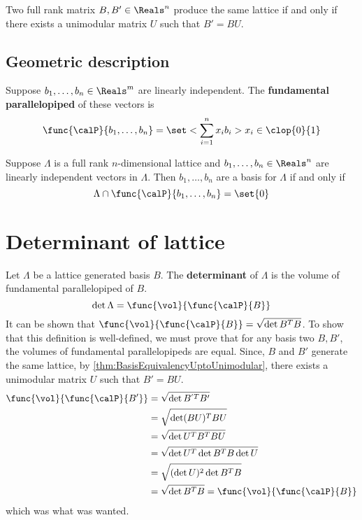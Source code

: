 \begin{theorem}\label{thm:BasisEquivalencyUptoUnimodular}
    Two full rank matrix \(B,B' \in \Reals^n\) produce the same lattice if and only if there exists a unimodular matrix \(U\) such that \(B' = BU\).
\end{theorem}

\subsection{Geometric description}
\begin{definition}
    Suppose \(b_1, \dots, b_n \in \Reals^m\) are linearly independent. The \textbf{fundamental parallelopiped} of these vectors is 
    \begin{equation*}
        \func{\calP}{b_1,\dots, b_n} = \set<\sum_{i=1}^n x_i b_i>{x_i \in \clop{0}{1}}
    \end{equation*}
\end{definition}

\begin{theorem}
    Suppose \(\Lambda\) is a full rank \(n\)-dimensional lattice and \(b_1, \dots, b_n \in \Reals^n\) are linearly independent vectors in \(\Lambda\). Then \(b_1, \dots, b_n\) are a basis for \(\Lambda\) if and only if 
    \begin{equation*}
        \Lambda \cap \func{\calP}{b_1,\dots, b_n} = \set{0}
    \end{equation*}
\end{theorem}

\section{Determinant of lattice}
\begin{definition}
    Let \(\Lambda\) be a lattice generated basis \(B\). The \textbf{determinant} of \(\Lambda\) is the volume of fundamental parallelopiped of \(B\).
    \begin{equation*}
        \det \Lambda = \func{\vol}{\func{\calP}{B}}
    \end{equation*}
    It can be shown that \(\func{\vol}{\func{\calP}{B}} = \sqrt{\det B^T B}\). To show that this definition is well-defined, we must prove that for any basis two \(B, B'\), the volumes of fundamental parallelopipeds are equal. Since, \(B\) and \(B'\) generate the same lattice, by \ref{thm:BasisEquivalencyUptoUnimodular}, there exists a unimodular matrix \(U\) such that \(B' = BU\).
    \begin{align*}
        \func{\vol}{\func{\calP}{B'}} &= \sqrt{\det B^{'T}B'}\\
        &= \sqrt{\det (BU)^T BU}\\
        &= \sqrt{\det U^T B^T B U}\\
        &= \sqrt{\det U^T \det B^T B \det U}\\
        &= \sqrt{(\det U)^2 \det B^T B}\\
        &= \sqrt{\det B^T B} = \func{\vol}{\func{\calP}{B}}
    \end{align*}
    which was what was wanted. 
\end{definition}


